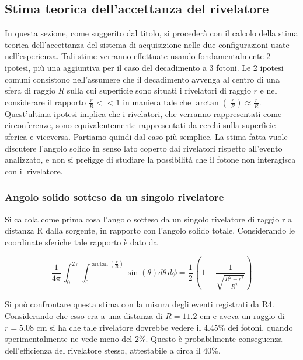 \subsection{Stima teorica dell'accettanza del rivelatore}
  In questa sezione, come suggerito dal titolo, si procederà con il calcolo della stima teorica dell'accettanza del sistema di acquisizione nelle due configurazioni usate 
  nell'esperienza. Tali stime verranno effettuate usando fondamentalmente 2 ipotesi, più una aggiuntiva per il caso del decadimento a 3 fotoni. Le 2 ipotesi comuni consistono 
  nell'assumere che il decadimento avvenga al centro di una sfera di raggio \(R\) sulla cui superficie sono situati i rivelatori di raggio \(r\) e nel considerare il rapporto 
  \( \frac{r}{R} << 1 \) in maniera tale che \(\arctan\left(\ \frac{r}{R} \right) \approx \frac{r}{R} \). Quest'ultima ipotesi implica che i rivelatori, che verranno rappresentati come
  circonferenze, sono equivalentemente rappresentati da cerchi sulla superficie sferica e viceversa. Partiamo quindi dal caso più semplice. La stima fatta vuole
discutere l'angolo solido in senso lato coperto dai rivelatori rispetto all'evento analizzato, e non si prefigge di studiare la possibilità che il fotone non
interagisca con il rivelatore.

  \subsubsection{Angolo solido sotteso da un singolo rivelatore}
  Si calcola come prima cosa l'angolo sotteso da un singolo rivelatore di raggio r a distanza R dalla sorgente, in rapporto  con l'angolo solido totale. Considerando le coordinate sferiche tale rapporto è dato da
  
  $$\frac{1}{4\pi}\,\int _{0}^{2\,\pi }\!\int _{0}^{\arctan \left( {\frac {r}{R}}\right) }\!\sin \left( \theta \right) {d\theta}\,{d\phi}=\frac{1}{2}\, \left(1 - {\frac {1}{\sqrt {{\frac {{R}^{2}+{r}^{2}}{{R}^{2}}}}}}\right)$$
 
  Si può confrontare questa stima con la misura degli eventi registrati da R4. Considerando che esso era a una distanza di $R =11.2$ cm e aveva un raggio di $r=5.08$ cm si ha
  che tale rivelatore dovrebbe vedere il 4.45\% dei fotoni, quando sperimentalmente ne vede meno del 2\%. Questo è probabilmente conseguenza dell'efficienza del rivelatore stesso,
  attestabile a circa il 40\%.
  
